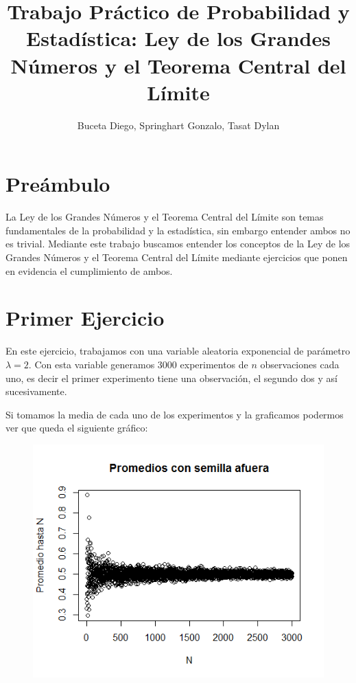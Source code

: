 \documentclass[a4paper]{article}
\title{{\Huge Trabajo Pr\'actico de Probabilidad y Estad\'istica:
	\linebreak 
	Ley de los Grandes N\'umeros y el Teorema Central del L\'imite}}
\author{Buceta Diego, Springhart Gonzalo, Tasat Dylan}
\begin{document}
	\maketitle %
	\thispagestyle{empty} %
	
	\newpage %
	\setcounter{page}{1} %
	
	
	\section{Pre\'ambulo}
	La Ley de los Grandes N\'umeros y el Teorema Central del L\'imite son temas fundamentales de la probabilidad y la estad\'istica, sin embargo entender ambos no es trivial. Mediante este trabajo buscamos entender los conceptos de la Ley de los Grandes N\'umeros y el Teorema Central del L\'imite mediante ejercicios que ponen en evidencia el cumplimiento de ambos.
	
	\newpage
	
	\section{Primer Ejercicio}
	
	En este ejercicio, trabajamos con una variable aleatoria exponencial de par\'ametro $\lambda = 2$. Con esta variable generamos 3000 experimentos de $n$ observaciones cada uno, es decir el primer experimento tiene una observaci\'on, el segundo dos y as\'i sucesivamente. 
	
Si tomamos la media de cada uno de los experimentos y la graficamos podermos ver que queda el siguiente gr\'afico:

	
	\begin{figure}[H]
		\includegraphics[scale=0.75]{grafico1}
		\centering
	\end{figure}
\end{document}

